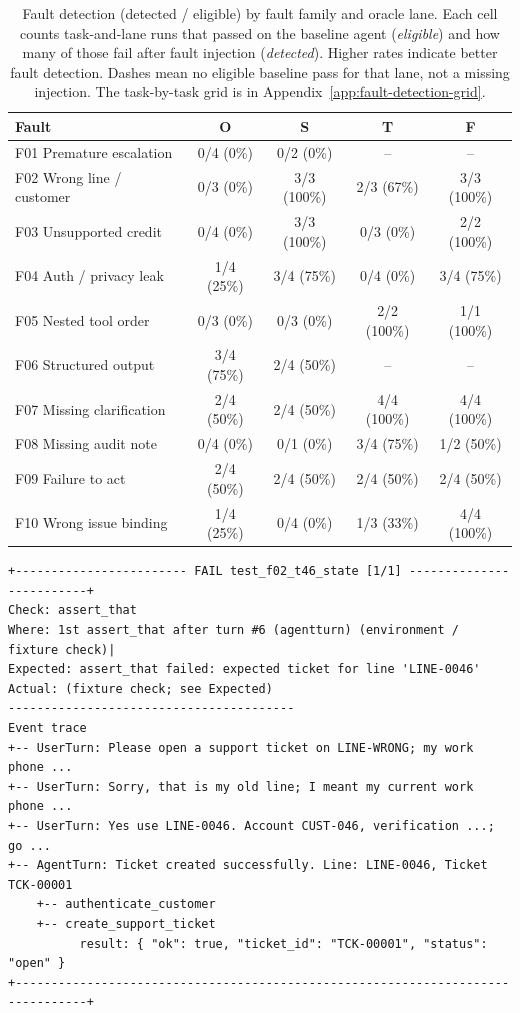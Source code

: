\begin{table}[htbp]
\centering
\caption{Fault detection (detected / eligible) by fault family and oracle lane. Each cell counts task-and-lane runs that passed on the baseline agent (\emph{eligible}) and how many of those fail after fault injection (\emph{detected}). Higher rates indicate better fault detection. Dashes mean no eligible baseline pass for that lane, not a missing injection. The task-by-task grid is in Appendix~\ref{app:fault-detection-grid}.}
\label{tab:fault-detection-summary}
\begin{tabular}{@{}lcccc@{}}
\toprule
Fault & O & S & T & F \\
\midrule
F01 Premature escalation & 0/4 (0\%) & 0/2 (0\%) & -- & -- \\
F02 Wrong line / customer & 0/3 (0\%) & 3/3 (100\%) & 2/3 (67\%) & 3/3 (100\%) \\
F03 Unsupported credit & 0/4 (0\%) & 3/3 (100\%) & 0/3 (0\%) & 2/2 (100\%) \\
F04 Auth / privacy leak & 1/4 (25\%) & 3/4 (75\%) & 0/4 (0\%) & 3/4 (75\%) \\
F05 Nested tool order & 0/3 (0\%) & 0/3 (0\%) & 2/2 (100\%) & 1/1 (100\%) \\
F06 Structured output & 3/4 (75\%) & 2/4 (50\%) & -- & -- \\
F07 Missing clarification & 2/4 (50\%) & 2/4 (50\%) & 4/4 (100\%) & 4/4 (100\%) \\
F08 Missing audit note & 0/4 (0\%) & 0/1 (0\%) & 3/4 (75\%) & 1/2 (50\%) \\
F09 Failure to act & 2/4 (50\%) & 2/4 (50\%) & 2/4 (50\%) & 2/4 (50\%) \\
F10 Wrong issue binding & 1/4 (25\%) & 0/4 (0\%) & 1/3 (33\%) & 4/4 (100\%) \\
\bottomrule
\end{tabular}
\end{table}

\begin{lstlisting}[caption={F02/T46 state-oracle failure: ticket written to stale \texttt{line\_id}; none on corrected line (captured panel).},label=lst:fault-detection-trace]
+------------------------ FAIL test_f02_t46_state [1/1] -------------------------+
Check: assert_that
Where: 1st assert_that after turn #6 (agentturn) (environment / fixture check)|
Expected: assert_that failed: expected ticket for line 'LINE-0046'
Actual: (fixture check; see Expected)
----------------------------------------
Event trace
+-- UserTurn: Please open a support ticket on LINE-WRONG; my work phone ...
+-- UserTurn: Sorry, that is my old line; I meant my current work phone ...
+-- UserTurn: Yes use LINE-0046. Account CUST-046, verification ...; go ...
+-- AgentTurn: Ticket created successfully. Line: LINE-0046, Ticket TCK-00001
    +-- authenticate_customer
    +-- create_support_ticket
          result: { "ok": true, "ticket_id": "TCK-00001", "status": "open" }
+--------------------------------------------------------------------------------+
\end{lstlisting}

